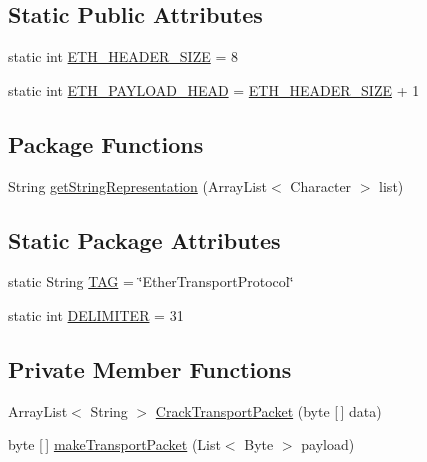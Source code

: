 \subsection*{Static Public Attributes}
\begin{DoxyCompactItemize}
\item 
static int \mbox{\hyperlink{classcom_1_1ethernom_1_1android_1_1etherapi_1_1_ether_transport_protocol_a4582a566e69ab602b9c7701a087e20b7}{E\+T\+H\+\_\+\+H\+E\+A\+D\+E\+R\+\_\+\+S\+I\+ZE}} = 8
\item 
static int \mbox{\hyperlink{classcom_1_1ethernom_1_1android_1_1etherapi_1_1_ether_transport_protocol_add3ef44db6370b856920f8cbef38de43}{E\+T\+H\+\_\+\+P\+A\+Y\+L\+O\+A\+D\+\_\+\+H\+E\+AD}} = \mbox{\hyperlink{classcom_1_1ethernom_1_1android_1_1etherapi_1_1_ether_transport_protocol_a4582a566e69ab602b9c7701a087e20b7}{E\+T\+H\+\_\+\+H\+E\+A\+D\+E\+R\+\_\+\+S\+I\+ZE}} + 1
\end{DoxyCompactItemize}
\subsection*{Package Functions}
\begin{DoxyCompactItemize}
\item 
String \mbox{\hyperlink{classcom_1_1ethernom_1_1android_1_1etherapi_1_1_ether_transport_protocol_aee2f3cf832c15ccf711a83a8269224d9}{get\+String\+Representation}} (Array\+List$<$ Character $>$ list)
\end{DoxyCompactItemize}
\subsection*{Static Package Attributes}
\begin{DoxyCompactItemize}
\item 
static String \mbox{\hyperlink{classcom_1_1ethernom_1_1android_1_1etherapi_1_1_ether_transport_protocol_aae9d17346d7cae7f3ca5c3962630381e}{T\+AG}} = \char`\"{}Ether\+Transport\+Protocol\char`\"{}
\item 
static int \mbox{\hyperlink{classcom_1_1ethernom_1_1android_1_1etherapi_1_1_ether_transport_protocol_ab3287e69f9de05b3e50f69ce0194301d}{D\+E\+L\+I\+M\+I\+T\+ER}} = 31
\end{DoxyCompactItemize}
\subsection*{Private Member Functions}
\begin{DoxyCompactItemize}
\item 
Array\+List$<$ String $>$ \mbox{\hyperlink{classcom_1_1ethernom_1_1android_1_1etherapi_1_1_ether_transport_protocol_ab653c54f20447fb1f71e55e56322b4f1}{Crack\+Transport\+Packet}} (byte \mbox{[}$\,$\mbox{]} data)
\item 
byte \mbox{[}$\,$\mbox{]} \mbox{\hyperlink{classcom_1_1ethernom_1_1android_1_1etherapi_1_1_ether_transport_protocol_a0d8874e2def3ca2e1372409470124bae}{make\+Transport\+Packet}} (List$<$ Byte $>$ payload)
\end{DoxyCompactItemize}
